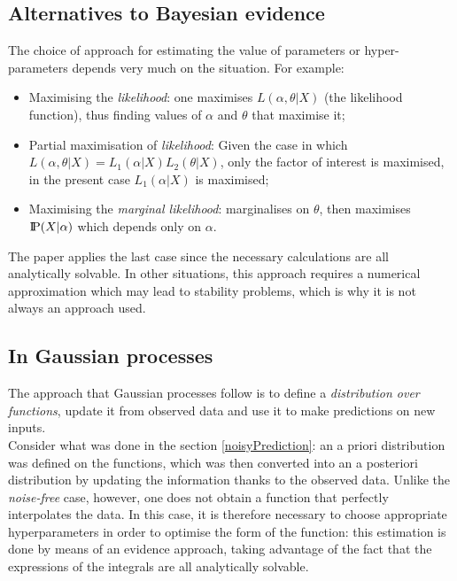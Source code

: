 \subsection{Alternatives to Bayesian evidence}
The choice of approach for estimating the value of parameters or hyper-parameters depends very much on the situation. For example:
\begin{itemize}
    \item Maximising the \textit{likelihood}:
    one maximises $L(\alpha, \theta | X)$ (the likelihood function), thus finding values of $\alpha$ and $\theta$ that maximise it;
    \item Partial maximisation of \textit{likelihood}:
    Given the case in which $L(\alpha, \theta |X)=L_1(\alpha | X)L_2(\theta|X)$, only the factor of interest is maximised, in the present case $L_1(\alpha | X)$ is maximised;
    \item Maximising the \textit{marginal likelihood}:
    marginalises on $\theta$, then maximises $\text{I\kern-0.18em P}(X|\alpha)$ which depends only on $\alpha$.
\end{itemize}
The paper applies the last case since the necessary calculations are all analytically solvable. In other situations, this approach requires a numerical approximation which may lead to stability problems, which is why it is not always an approach used.




\subsection{In Gaussian processes}\label{neiProcessiGaussiani}
The approach that Gaussian processes follow is to define a \textit{distribution over functions}, update it from observed data and use it to make predictions on new inputs. \\
Consider what was done in the section \ref{noisyPrediction}: an a priori distribution was defined on the functions, which was then converted into an a posteriori distribution by updating the information thanks to the observed data. Unlike the \textit{noise-free} case, however, one does not obtain a function that perfectly interpolates the data. In this case, it is therefore necessary to choose appropriate hyperparameters in order to optimise the form of the function: this estimation is done by means of an evidence approach, taking advantage of the fact that the expressions of the integrals are all analytically solvable.\\



